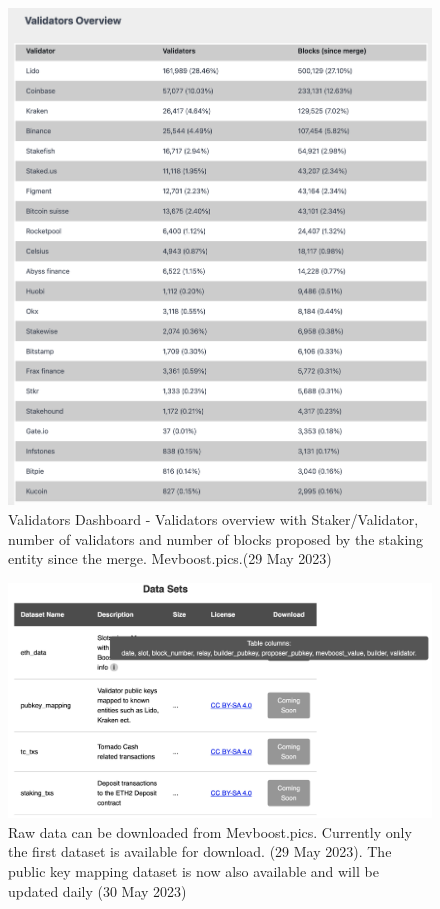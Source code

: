 \documentclass[UTF8]{article}
\begin{document}
{\begin{figure}[htbp]
\begin{center}
\includegraphics[width=0.9\linewidth]{images/mevvalidator4}
\caption{Validators Dashboard - Validators overview with Staker/Validator, number of validators and number of blocks proposed by the staking entity since the merge. Mevboost.pics.(29 May 2023)}
\label{fig:mevvalidator4}
\end{center}
\end{figure}

\begin{figure}[htbp]
\begin{center}
\includegraphics[width=0.9\linewidth]{images/mevboostrawdata}
\caption{Raw data can be downloaded from Mevboost.pics. Currently only the first dataset is available for download. (29 May 2023). The public key mapping dataset is now also available and will be updated daily (30 May 2023)}
\label{fig:mevboostrawdata}
\end{center}
\end{figure}

}
\end{document}
